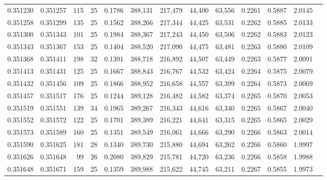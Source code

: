 \begin{tabular}{rrrrrrrrrrrrr}
0.351230 & 0.351257 &   115 &  25 &                                     0.1786 & 388,131 & 217,479 &  44,400 &  63,556 & 0.2261 & 0.5887 & 2.0145 \\
0.351258 & 0.351299 &   135 &  25 &                                     0.1562 & 388,266 & 217,344 &  44,425 &  63,531 & 0.2262 & 0.5885 & 2.0133 \\
0.351300 & 0.351343 &   101 &  25 &                                     0.1984 & 388,367 & 217,243 &  44,450 &  63,506 & 0.2262 & 0.5883 & 2.0123 \\
0.351343 & 0.351367 &   153 &  25 &                                     0.1404 & 388,520 & 217,090 &  44,475 &  63,481 & 0.2263 & 0.5880 & 2.0109 \\
0.351368 & 0.351411 &   198 &  32 &                                     0.1391 & 388,718 & 216,892 &  44,507 &  63,449 & 0.2263 & 0.5877 & 2.0091 \\
0.351413 & 0.351431 &   125 &  25 &                                     0.1667 & 388,843 & 216,767 &  44,532 &  63,424 & 0.2264 & 0.5875 & 2.0079 \\
0.351432 & 0.351456 &   109 &  25 &                                     0.1866 & 388,952 & 216,658 &  44,557 &  63,399 & 0.2264 & 0.5873 & 2.0069 \\
0.351457 & 0.351517 &   176 &  25 &                                     0.1244 & 389,128 & 216,482 &  44,582 &  63,374 & 0.2265 & 0.5870 & 2.0053 \\
0.351519 & 0.351551 &   139 &  34 &                                     0.1965 & 389,267 & 216,343 &  44,616 &  63,340 & 0.2265 & 0.5867 & 2.0040 \\
0.351552 & 0.351572 &   122 &  25 &                                     0.1701 & 389,389 & 216,221 &  44,641 &  63,315 & 0.2265 & 0.5865 & 2.0029 \\
0.351573 & 0.351589 &   160 &  25 &                                     0.1351 & 389,549 & 216,061 &  44,666 &  63,290 & 0.2266 & 0.5863 & 2.0014 \\
0.351590 & 0.351625 &   181 &  28 &                                     0.1340 & 389,730 & 215,880 &  44,694 &  63,262 & 0.2266 & 0.5860 & 1.9997 \\
0.351626 & 0.351648 &    99 &  26 &                                     0.2080 & 389,829 & 215,781 &  44,720 &  63,236 & 0.2266 & 0.5858 & 1.9988 \\
0.351648 & 0.351671 &   159 &  25 &                                     0.1359 & 389,988 & 215,622 &  44,745 &  63,211 & 0.2267 & 0.5855 & 1.9973 \\

\end{tabular}
